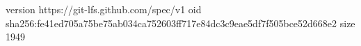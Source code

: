 version https://git-lfs.github.com/spec/v1
oid sha256:fe41ed705a75be75ab034ca752603ff717e84dc3c9eae5df7f505bce52d668e2
size 1949

